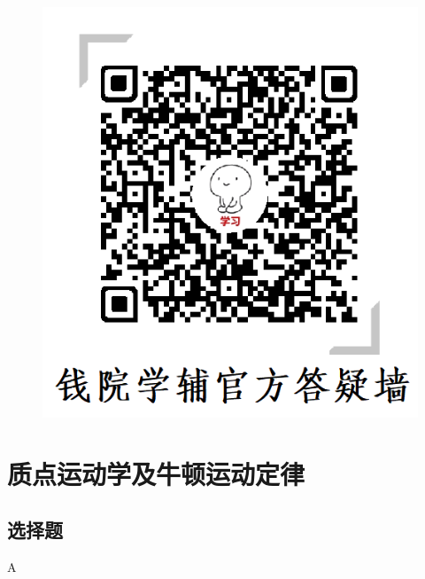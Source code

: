 \documentclass[b5paper,opensource,sourcefont,parskip]{qyxf-book}
\begin{document}
\begin{figure}[!h]
\begin{minipage}[c]{0.5\textwidth}
		\includegraphics[scale=0.5]{qxf.png}
	\end{minipage}
\end{figure}


\cleardoublepage

\tableofcontents

\setlength{\parindent}{0pt}
\chapter{质点运动学及牛顿运动定律}
\section{选择题}
A
\end{document}
